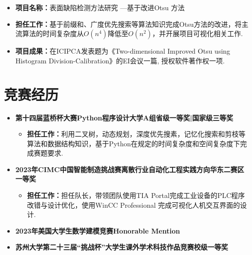 \documentclass[UTF8,AutoFakeBold]{resume}
\begin{document}
\begin{itemize}
    \begin{itemize}
        \item[\faThumbTack] \kaishu \textbf{项目名称：}表面缺陷检测方法研究 —基于改进Otsu 方法
        \item[\faThumbTack] \kaishu \textbf{担任工作：}基于前缀和、广度优先搜索等算法知识完成Otsu方法的改进，将主流算法的时间复杂度从$O(n^4)$降低至$O(n^2)$，并开展项目可视化相关工作.
        \item[\faThumbTack] \kaishu \textbf{项目成果：}在ICIPCA发表题为《Two-dimensional Improved Otsu using Histogram Division-Calibration》的EI会议一篇, 授权软件著作权一项.
    \end{itemize}
\end{itemize}    

\vspace{0.1em}
\section{\hspace{0.25em}\makebox[0.75em][c]{\faTrophy}\hspace{0.25em} \fangsong\textbf{竞赛经历}}
    \vspace{0.1em}

\begin{itemize}
    \sloppy{}
    \item 
    {\large\kaishu\textbf{第十四届蓝桥杯大赛Python程序设计大学A组\hspace{3.6cm}省级一等奖|国家级三等奖}}
    \begin{itemize}
        \item[\faThumbTack] \kaishu \textbf{担任工作：}利用二叉树，动态规划，深度优先搜素，记忆化搜索和剪枝等算法和数据结构知识，基于Python在规定的时间复杂度和空间复杂度下完成赛题要求.
    \end{itemize}
    
    \item
    {\large\kaishu\textbf{2023年CIMC中国智能制造挑战赛离散行业自动化工程实践方向\hspace{2cm}华东二赛区一等奖}}
    \begin{itemize}
        \item[\faThumbTack] \kaishu \textbf{担任工作：}担任队长，带领团队使用TIA Portal完成工业设备的PLC程序改错与设计优化，使用WinCC Professional 完成可视化人机交互界面的设计.
    \end{itemize}  

    \item 
    {\large\kaishu\textbf{2023年美国大学生数学建模竞赛\hspace{7.8cm}Honorable Mention}}

    \item
    {\large\kaishu\textbf{苏州大学第二十三届“挑战杯”大学生课外学术科技作品竞赛\hspace{4cm}校级一等奖}}
\end{itemize}
\end{document}
